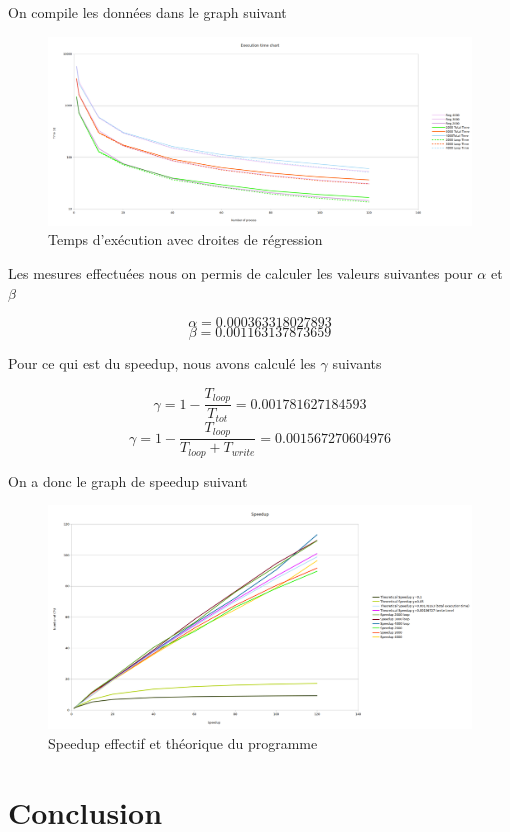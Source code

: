 \documentclass[12pt,a4paper,oneside, titlepage]{report}
\begin{document}
On compile les données dans le graph suivant

	\begin{figure}[H]
		\caption {Temps d'exécution avec droites de régression}
    \includegraphics[scale=0.32]{time}
    \centering
  \end{figure}

	Les mesures effectuées nous on permis de calculer les valeurs suivantes pour $\alpha$ et $\beta$

	$$\alpha = 0.000363318027893$$
	$$\beta = 0.001163137873659$$

	\newpage

	Pour ce qui est du speedup, nous avons calculé les $\gamma$ suivants

	$$\gamma = 1- \frac{T_{loop}}{T_{tot}} = 0.001781627184593$$
	$$\gamma = 1- \frac{T_{loop}}{T_{loop} + T_{write}} = 0.001567270604976$$

	On a donc le graph de speedup suivant

	\begin{figure}[H]
		\caption {Speedup effectif et théorique du programme}
		\includegraphics[scale=0.32]{speedup}
		\centering
	\end{figure}

	\section*{Conclusion}
\end{document}
